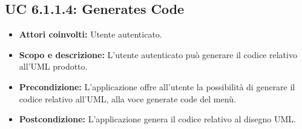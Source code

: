 \subsection{UC 6.1.1.4: Generates Code}
\begin{itemize}
		\item \textbf{Attori coinvolti:} Utente autenticato. \\
		\item \textbf{Scopo e descrizione:} L'utente autenticato può generare il codice relativo all'UML prodotto. \\
		\item \textbf{Precondizione:} L'applicazione offre all'utente la possibilità di generare il codice relativo all'UML, alla voce generate code del menù. \\
		\item \textbf{Postcondizione:} L'applicazione genera il codice relativo al disegno UML. \\
\end{itemize}